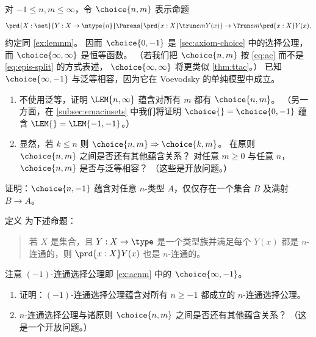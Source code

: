 \begin{ex}\label{ex:acnm}
  对 $-1\le n,m\le\infty$，令 $\choice{n,m}$ 表示命题
  \[ \prd{X:\set}{Y:X\to\ntype{n}}
  \Parens{\prd{x:X} \trunc m{Y(x)}}
  \to
  \Trunc m{\prd{x:X} Y(x)},
  \]
  约定同 \cref{ex:lemnm}。
  因而 $\choice{0,-1}$ 是 \cref{sec:axiom-choice} 中的选择公理，
  而 $\choice{\infty,\infty}$ 是恒等函数。
  （若我们把 $\choice{n,m}$ 按 \eqref{eq:ac} 而不是 \eqref{eq:epis-split} 的方式表述，
  $\choice{\infty,\infty}$ 将更类似 \cref{thm:ttac}。）
  已知 $\choice{\infty,-1}$ 与泛等相容，因为它在 Voevodsky 的单纯模型中成立。
  \begin{enumerate}
  \item 不使用泛等，证明 $\LEM{n,\infty}$ 蕴含对所有 $m$ 都有 $\choice{n,m}$。
    （另一方面，在 \cref{subsec:emacinsets} 中我们将证明 $\choice{}=\choice{0,-1}$ 蕴含 $\LEM{}=\LEM{-1,-1}$。）
  \item 显然，若 $k\le n$ 则 $\choice{n,m}\Rightarrow \choice{k,m}$。
    在原则 $\choice{n,m}$ 之间是否还有其他蕴含关系？
    对任意 $m\ge 0$ 与任意 $n$，$\choice{n,m}$ 是否与泛等相容？
    （这些是开放问题。）
  \end{enumerate}
\end{ex}

\begin{ex}\label{ex:acnm-surjset}
  证明：$\choice{n,-1}$ 蕴含对任意 $n$-类型 $A$，仅仅存在一个集合 $B$ 及满射 $B\to A$。
\end{ex}

\begin{ex}\label{ex:acconn}
  定义
  为下述命题：
  \begin{quote}
    若 $X$ 是集合，且 $Y:X\to \type$ 是一个类型族并满足每个 $Y(x)$ 都是 $n$-连通的，则 $\prd{x:X} Y(x)$ 也是 $n$-连通的。
  \end{quote}
  注意 $(-1)$-连通选择公理即 \cref{ex:acnm} 中的 $\choice{\infty,-1}$。
  \begin{enumerate}
  \item 证明：$(-1)$-连通选择公理蕴含对所有 $n\ge -1$ 都成立的 $n$-连通选择公理。
  \item $n$-连通选择公理与诸原则 $\choice{n,m}$ 之间是否还有其他蕴含关系？
    （这是一个开放问题。）
  \end{enumerate}
\end{ex}

